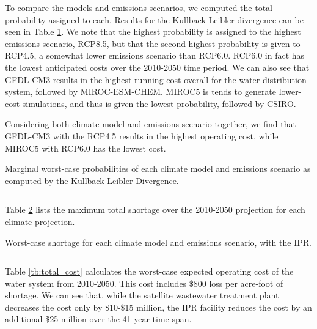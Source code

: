 \documentclass[opre,nonblindrev]{informs3} %
\begin{document}
To compare the models and emissions scenarios, we computed the total probability assigned to each.
Results for the Kullback-Leibler divergence can be seen in Table \ref{tb:pworst_model_emission_kl}.
We note that the highest probability is assigned to the highest emissions scenario, RCP8.5, but that the second highest probability is given to RCP4.5, a somewhat lower emissions scenario than RCP6.0.
RCP6.0 in fact has the lowest anticipated costs over the 2010-2050 time period.
We can also see that GFDL-CM3 results in the highest running cost overall for the water distribution system, followed by MIROC-ESM-CHEM.
MIROC5 is tends to generate lower-cost simulations, and thus is given the lowest probability, followed by CSIRO.

Considering both climate model and emissions scenario together, we find that GFDL-CM3 with the RCP4.5 results in the highest operating cost, while MIROC5 with RCP6.0 has the lowest cost.

\begin{table}
	\TABLE
	{
		Marginal worst-case probabilities of each climate model and emissions scenario as computed by the Kullback-Leibler Divergence.
		\label{tb:pworst_model_emission_kl}
	}
	{\begin{tabular}{l|cccc|c}
		
	 \end{tabular}}
	{}
\end{table}

Table \ref{tb:shortage_model_emission_kl} lists the maximum total shortage over the 2010-2050 projection for each climate projection.

\begin{table}
	\TABLE
	{
		Worst-case shortage for each climate model and emissions scenario, with the IPR.
		\label{tb:shortage_model_emission_kl}
	}
	{\begin{tabular}{l|cccc|c}
		
	 \end{tabular}}
	{}
\end{table}

Table \ref{tb:total_cost} calculates the worst-case expected operating cost of the water system from 2010-2050.
This cost includes \$800 loss per acre-foot of shortage.
We can see that, while the satellite wastewater treatment plant decreases the cost only by \$10-\$15 million, the IPR facility reduces the cost by an additional \$25 million over the 41-year time span.
\end{document}
